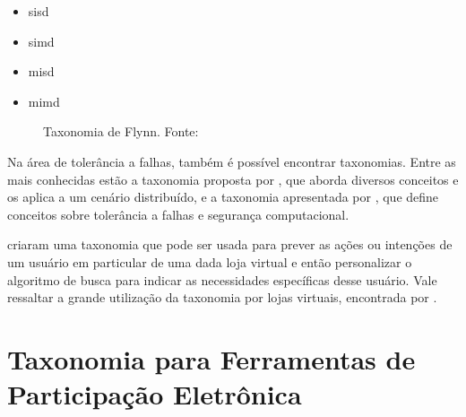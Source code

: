 \begin{minipage}{.66\textwidth}
    \begin{singlespace}
        \begin{itemize}
            \item \acrfull{sisd}
            \item \acrfull{simd}
            \item \acrfull{misd}
            \item \acrfull{mimd}
        \end{itemize}
    \end{singlespace}
\end{minipage}
\vspace{0.5cm}

\begin{figure}[!ht]
    \caption{Taxonomia de Flynn. Fonte: }
    \label{fig:taxonomiaFlynn}  
\end{figure}

\vspace{0.5cm}
\par
Na área de tolerância a falhas, também é possível encontrar taxonomias. Entre as mais conhecidas estão a taxonomia proposta por
, que aborda diversos conceitos e os aplica a um cenário distribuído,
e a taxonomia apresentada por , que define conceitos sobre tolerância a falhas e segurança computacional.

\par
{} criaram uma taxonomia que pode ser usada para prever as ações ou intenções de um usuário em particular de uma dada loja virtual
e então personalizar o algoritmo de busca para indicar as necessidades específicas desse usuário. Vale ressaltar a grande utilização da taxonomia por lojas virtuais,
encontrada por \cite{sondhi2018taxonomy}.

\section{Taxonomia para Ferramentas de Participação Eletrônica}
\label{sec:taxonomia e-part tools}

